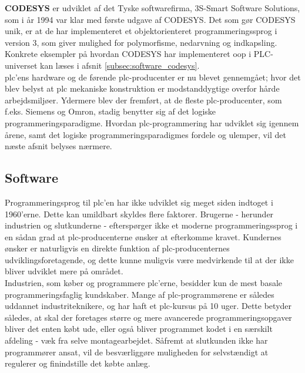 \label{subsec:codesys}
\noindent\textbf{CODESYS} er udviklet af det Tyske softwarefirma, 3S-Smart Software Solutions, som i år 1994 var klar med første udgave af CODESYS. Det som gør CODESYS unik, er at de har implementeret et objektorienteret programmeringssprog i version 3, som giver mulighed for polymorfisme, nedarvning og indkapsling. Konkrete eksempler på hvordan CODESYS har implementeret \gls{oop} i PLC-universet kan læses i afsnit \ref{subsec:software_codesys}. \\

\noindent \gls{plc}'ens hardware og de førende \gls{plc}-producenter er nu blevet gennemgået; hvor det blev belyst at \gls{plc} mekaniske konstruktion er modstanddygtige overfor hårde arbejdsmiljøer. Ydermere blev der fremført, at de fleste \gls{plc}-producenter, som f.eks. Siemens og Omron, stadig benytter sig af det logiske programmeringsparadigme. 
Hvordan \gls{plc}-programmering har udviklet sig igennem årene, samt det logiske programmeringsparadigmes fordele og ulemper, vil det næste afsnit belyses nærmere.

\subsection{Software}
Programmeringsprog til \gls{plc}'en har ikke udviklet sig meget siden indtoget i 1960'erne. Dette kan umildbart skyldes flere faktorer. Brugerne - herunder industrien og slutkunderne - efterspørger ikke et moderne programmeringssprog i en sådan grad at \gls{plc}-producenterne ønsker at efterkomme kravet. Kundernes ønsker er naturligvis en direkte funktion af \gls{plc}-producenternes udviklingsforetagende, og dette kunne muligvis være medvirkende til at der ikke bliver udviklet mere på området. \\

\noindent Industrien, som køber og programmere \gls{plc}'erne, besidder kun de mest basale programmeringsfaglig kundskaber. Mange af \gls{plc}-programmørene er således uddannet industriteknikere, og har haft et \gls{plc}-kursus på 10 uger. Dette betyder således, at skal der foretages større og mere avancerede programmeringsopgaver bliver det enten købt ude, eller også bliver programmet kodet i en særskilt afdeling - væk fra selve montagearbejdet. Såfremt at slutkunden ikke har programmører ansat, vil de besværliggøre muligheden for selvstændigt at regulerer og finindstille det købte anlæg. 

